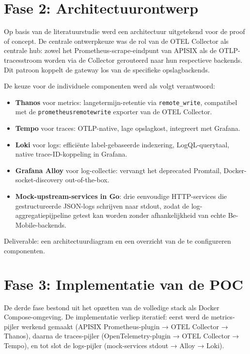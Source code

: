 \section{Fase 2: Architectuurontwerp}%
\label{sec:fase-architectuurontwerp}

Op basis van de literatuurstudie werd een architectuur uitgetekend voor de proof of concept. De centrale ontwerpkeuze was de rol van de OTEL Collector als centrale hub: zowel het Prometheus-scrape-eindpunt van APISIX als de OTLP-tracesstroom worden via de Collector gerouteerd naar hun respectieve backends. Dit patroon koppelt de gateway los van de specifieke opslagbackends.

De keuze voor de individuele componenten werd als volgt verantwoord:

\begin{itemize}
  \item \textbf{Thanos} voor metrics: langetermijn-retentie via \texttt{remote\_write}, compatibel met de \texttt{prometheusremotewrite} exporter van de OTEL Collector.
  \item \textbf{Tempo} voor traces: OTLP-native, lage opslagkost, integreert met Grafana.
  \item \textbf{Loki} voor logs: efficiënte label-gebaseerde indexering, LogQL-querytaal, native trace-ID-koppeling in Grafana.
  \item \textbf{Grafana Alloy} voor log-collectie: vervangt het deprecated Promtail, Docker-socket-discovery out-of-the-box.
  \item \textbf{Mock-upstream-services in Go}: drie eenvoudige HTTP-services die gestructureerde JSON-logs schrijven naar stdout, zodat de log-aggregatiepijpeline getest kan worden zonder afhankelijkheid van echte Be-Mobile-backends.
\end{itemize}

Deliverable: een architectuurdiagram en een overzicht van de te configureren componenten.

\section{Fase 3: Implementatie van de POC}%
\label{sec:fase-implementatie}

De derde fase bestond uit het opzetten van de volledige stack als Docker Compose-omgeving. De implementatie verliep iteratief: eerst werd de metrics-pijler werkend gemaakt (APISIX Prometheus-plugin → OTEL Collector → Thanos), daarna de traces-pijler (OpenTelemetry-plugin → OTEL Collector → Tempo), en tot slot de logs-pijler (mock-services stdout → Alloy → Loki).

